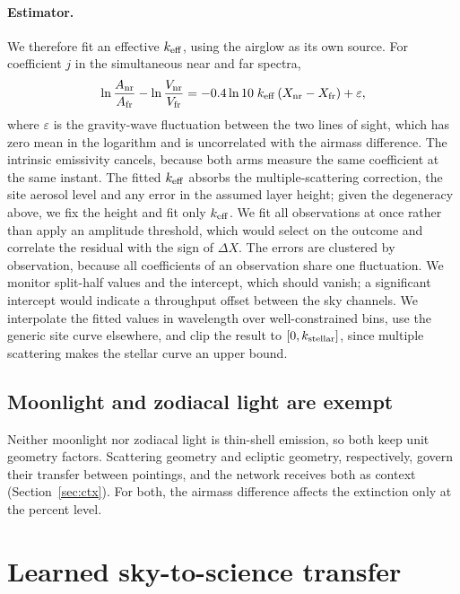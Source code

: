 \paragraph{Estimator.} We therefore fit an effective $k_{\rm eff}$, using the
airglow as its own source. For coefficient $j$ in the simultaneous near and
far spectra,
\begin{equation}
  \ln\frac{A_{\rm nr}}{A_{\rm fr}} - \ln\frac{V_{\rm nr}}{V_{\rm fr}}
  = -0.4\ln10\;k_{\rm eff}\,(X_{\rm nr}-X_{\rm fr}) + \varepsilon ,
\end{equation}
where $\varepsilon$ is the gravity-wave fluctuation between the two lines of
sight, which has zero mean in the logarithm and is uncorrelated with the
airmass difference. The intrinsic emissivity cancels, because both arms
measure the same coefficient at the same instant. The fitted $k_{\rm eff}$
absorbs the multiple-scattering correction, the site aerosol level and any
error in the assumed layer height; given the degeneracy above, we fix the
height and fit only $k_{\rm eff}$. We fit all observations at once rather
than apply an amplitude threshold, which would select on the outcome and
correlate the residual with the sign of $\Delta X$. The errors are clustered
by observation, because all coefficients of an observation share one
fluctuation. We monitor split-half values and the intercept, which should
vanish; a significant intercept would indicate a throughput offset between
the sky channels. We interpolate the fitted values in wavelength over
well-constrained bins, use the generic site curve elsewhere, and clip the
result to $[0, k_{\rm stellar}]$, since multiple scattering makes the
stellar curve an upper bound.

\subsection{Moonlight and zodiacal light are exempt}
\label{sec:exempt}

Neither moonlight nor zodiacal light is thin-shell emission, so both keep
unit geometry factors. Scattering geometry and ecliptic geometry,
respectively, govern their transfer between pointings, and the network
receives both as context (Section~\ref{sec:ctx}). For both, the airmass
difference affects the extinction only at the percent level.

\section{Learned sky-to-science transfer}
\label{sec:ml}

